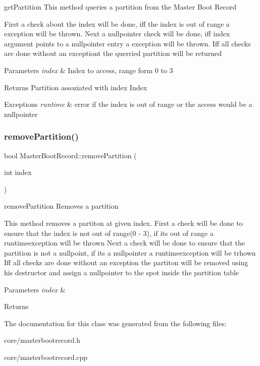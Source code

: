 get\+Partition This method queries a partition from the Master Boot Record 

First a check about the index will be done, iff the index is out of range a exception will be thrown. Next a nullpointer check will be done, iff index argument points to a nullpointer entry a exception will be thrown. Iff all checks are done without an exceptiont the querried partition will be returned 
\begin{DoxyParams}{Parameters}
{\em index} & Index to access, range form 0 to 3 \\
\hline
\end{DoxyParams}
\begin{DoxyReturn}{Returns}
Partition assoziated with index Index 
\end{DoxyReturn}

\begin{DoxyExceptions}{Exceptions}
{\em runtime} & error if the index is out of range or the access would be a nullpointer \\
\hline
\end{DoxyExceptions}
\mbox{\label{classdisk_1_1_master_boot_record_af155df4b9738c217678a8f875e679c50}} 
\subsubsection{\texorpdfstring{remove\+Partition()}{removePartition()}}
{\footnotesize\ttfamily bool Master\+Boot\+Record\+::remove\+Partition (\begin{DoxyParamCaption}\item[{int}]{index }\end{DoxyParamCaption})}



remove\+Partition Removes a partition 

This method removes a partiton at given index. First a check will be done to ensure that the index is not out of range(0 -\/ 3), if its out of range a runtimeexception will be thrown Next a check will be done to ensure that the partition is not a nullpoint, if its a nullpointer a runtimeexception will be trhown Iff all checks are done without an exception the partiton will be removed using his destructor and assign a nullpointer to the spot inside the partition table 
\begin{DoxyParams}{Parameters}
{\em index} & \\
\hline
\end{DoxyParams}
\begin{DoxyReturn}{Returns}

\end{DoxyReturn}


The documentation for this class was generated from the following files\+:\begin{DoxyCompactItemize}
\item 
core/masterbootrecord.\+h\item 
core/masterbootrecord.\+cpp\end{DoxyCompactItemize}
